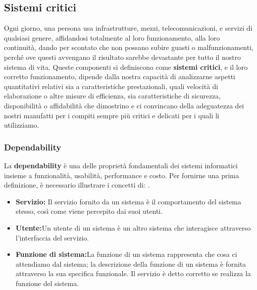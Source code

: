 \documentclass[14pt]{extarticle}
\begin{document}
\subsection{Sistemi critici}
Ogni giorno, una persona usa infrastrutture, mezzi, telecomunicazioni, e servizi di qualsiasi genere, affidandosi totalmente al loro funzionamento, alla loro continuità, dando per scontato che non possano subire guasti o malfunzionamenti, perché ove questi avvengano il risultato sarebbe devastante per tutto il nostro sistema di vita. Queste componenti si definiscono come \textbf{sistemi critici}, e  il loro corretto funzionamento, dipende dalla nostra capacità di analizzarne aspetti quantitativi relativi sia a caratteristiche prestazionali, quali velocità di elaborazione o altre misure di efficienza,
sia caratteristiche di sicurezza, disponibilità o affidabilità che dimostrino e ci
convincano della adeguatezza dei nostri manufatti per i compiti sempre più
critici e delicati per i quali li utilizziamo.

\subsubsection{Dependability}
La \textbf{dependability} è una delle proprietà fondamentali dei sistemi informatici insieme a funzionalità, usabilità, performance e costo. Per fornirne una prima definizione, è necessario illustrare i concetti di: \cite{avizienis2004basic}.
\begin{itemize}
\item \textbf{Servizio:} Il servizio fornito da un sistema è il comportamento del sistema stesso, così come viene percepito dai suoi utenti.
\item \textbf{Utente:}Un utente di un sistema è un altro sistema che interagisce attraverso l'interfaccia del servizio.
\item \textbf{Funzione di sistema:}La funzione di un sistema rappresenta che cosa ci attendiamo dal sistema; la descrizione della funzione di un sistema è fornita attraverso la sua specifica funzionale. Il servizio è detto corretto se realizza la funzione del sistema.
\end{itemize}
\end{document}

